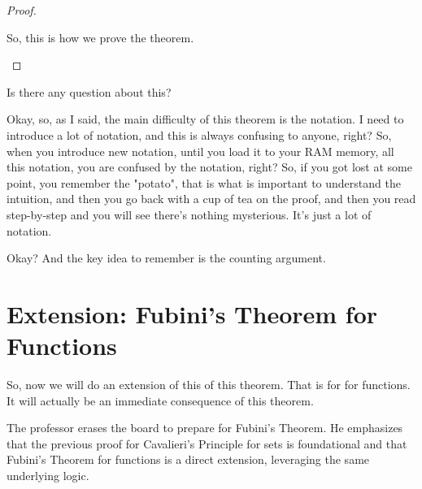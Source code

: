 \begin{proof}
\begin{spoken-clean}[00:15:39 - 00:15:42]
So, this is how we prove the theorem.
\end{spoken-clean}

\end{proof}

\begin{spoken-clean}[00:15:46 - 00:15:47]
Is there any question about this?
\end{spoken-clean}

\begin{spoken-clean}[00:16:00 - 00:16:21]
Okay, so, as I said, the main difficulty of this theorem is the notation. I need to introduce a lot of notation, and this is always confusing to anyone, right? So, when you introduce new notation, until you load it to your RAM memory, all this notation, you are confused by the notation, right? So, if you got lost at some point, you remember the "potato", that is what is important to understand the intuition, and then you go back with a cup of tea on the proof, and then you read step-by-step and you will see there's nothing mysterious. It's just a lot of notation.
\end{spoken-clean}

\begin{spoken-clean}[00:16:21 - 00:16:22]
Okay? And the key idea to remember is the counting argument.
\end{spoken-clean}

\section{Extension: Fubini's Theorem for Functions}

\begin{spoken-clean}[00:16:22 - 00:16:32]
So, now we will do an extension of this of this theorem. That is for for functions. It will actually be an immediate consequence of this theorem.
\end{spoken-clean}
\begin{math-stroke}
\begin{center}
\vspace{1cm} %
\end{center}
\begin{explanation-of-steps}
The professor erases the board to prepare for Fubini's Theorem. He emphasizes that the previous proof for Cavalieri's Principle for sets is foundational and that Fubini's Theorem for functions is a direct extension, leveraging the same underlying logic.
\end{explanation-of-steps}
\end{math-stroke}


